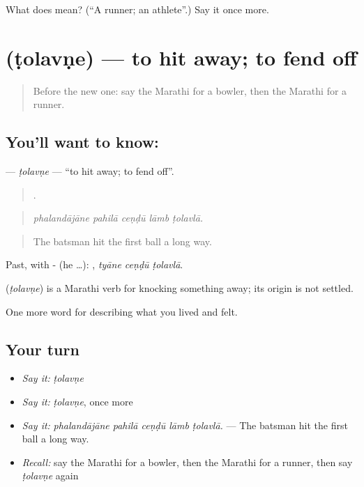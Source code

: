 \begin{tcolorbox}[breakable,colback=teal!4,colframe=teal!35!black,title={Before you move on}]
What does  mean? (\textquotedblleft{}A runner; an athlete\textquotedblright{}.) Say it once more.
\end{tcolorbox}
\section[\texorpdfstring{\mr{टोलवणे} (ṭolavṇe)}{टोलवणे (ṭolavṇe)}]{ (ṭolavṇe) — to hit away; to fend off}

\label{lesson:MR-C531-tolavne}



\begin{quote}
Before the new one: say the Marathi for a bowler, then the Marathi for a runner.
\end{quote}

\subsection*{You'll want to know: }
\textbf{} — \emph{ṭolavṇe} — \textquotedblleft{}to hit away; to fend off\textquotedblright{}.

\begin{quote}
    .
\end{quote}

\begin{quote}
\emph{phalandājāne pahilā ceṇḍū lāmb ṭolavlā.}
\end{quote}

\begin{quote}
The batsman hit the first ball a long way.
\end{quote}

Past, with - (he …):   , \emph{tyāne ceṇḍū ṭolavlā}.

\begin{cousinweb}
\textbf{} (\emph{ṭolavṇe}) is a Marathi verb for knocking something away; its origin is not settled.
\end{cousinweb}

\begin{grammarlens}[title={What you've built}]
One more word for describing what you lived and felt.
\end{grammarlens}

\subsection*{Your turn}
\begin{itemize}
\raggedright
  \item \emph{Say it:} \emph{ṭolavṇe}
  \item \emph{Say it:} \emph{ṭolavṇe}, once more
  \item \emph{Say it:} \emph{phalandājāne pahilā ceṇḍū lāmb ṭolavlā.} — The batsman hit the first ball a long way.
  \item \emph{Recall:} say the Marathi for a bowler, then the Marathi for a runner, then say \emph{ṭolavṇe} again
\end{itemize}

